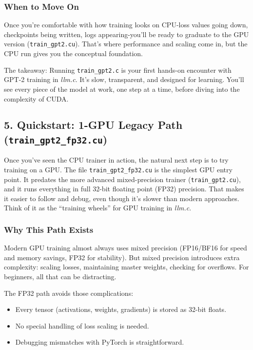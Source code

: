 \documentclass[
  letterpaper,
  DIV=11,
  numbers=noendperiod]{scrreprt}
\providecommand{\tightlist}{%
  \setlength{\itemsep}{0pt}\setlength{\parskip}{0pt}}
\begin{document}
\subsubsection{When to Move On}\label{when-to-move-on}

Once you're comfortable with how training looks on CPU-loss values going
down, checkpoints being written, logs appearing-you'll be ready to
graduate to the GPU version (\texttt{train\_gpt2.cu}). That's where
performance and scaling come in, but the CPU run gives you the
conceptual foundation.

The takeaway: Running \texttt{train\_gpt2.c} is your first hands-on
encounter with GPT-2 training in \emph{llm.c}. It's slow, transparent,
and designed for learning. You'll see every piece of the model at work,
one step at a time, before diving into the complexity of CUDA.

\subsection{\texorpdfstring{5. Quickstart: 1-GPU Legacy Path
(\texttt{train\_gpt2\_fp32.cu})}{5. Quickstart: 1-GPU Legacy Path (train\_gpt2\_fp32.cu)}}\label{quickstart-1-gpu-legacy-path-train_gpt2_fp32.cu}

Once you've seen the CPU trainer in action, the natural next step is to
try training on a GPU. The file \texttt{train\_gpt2\_fp32.cu} is the
simplest GPU entry point. It predates the more advanced mixed-precision
trainer (\texttt{train\_gpt2.cu}), and it runs everything in full 32-bit
floating point (FP32) precision. That makes it easier to follow and
debug, even though it's slower than modern approaches. Think of it as
the ``training wheels'' for GPU training in \emph{llm.c}.

\subsubsection{Why This Path Exists}\label{why-this-path-exists}

Modern GPU training almost always uses mixed precision (FP16/BF16 for
speed and memory savings, FP32 for stability). But mixed precision
introduces extra complexity: scaling losses, maintaining master weights,
checking for overflows. For beginners, all that can be distracting.

The FP32 path avoids those complications:

\begin{itemize}
\tightlist
\item
  Every tensor (activations, weights, gradients) is stored as 32-bit
  floats.
\item
  No special handling of loss scaling is needed.
\item
  Debugging mismatches with PyTorch is straightforward.
\end{itemize}
\end{document}
